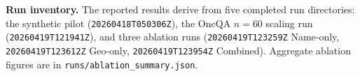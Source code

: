 \documentclass[11pt,a4paper]{article}
\begin{document}
\textbf{Run inventory.} The reported results derive from five completed run
directories: the synthetic pilot (\texttt{20260418T050306Z}), the OncQA
$n=60$ scaling run (\texttt{20260419T121941Z}), and three ablation runs
(\texttt{20260419T123259Z} Name-only, \texttt{20260419T123612Z} Geo-only,
\texttt{20260419T123954Z} Combined). Aggregate ablation figures are in
\texttt{runs/ablation\_summary.json}.
\end{document}
